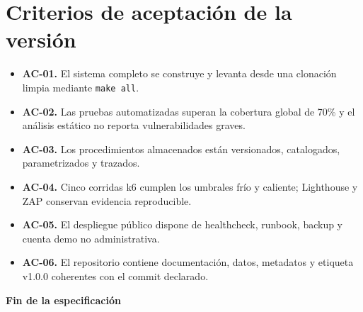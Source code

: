 \documentclass[11pt,a4paper]{article}
\begin{document}
\section{Criterios de aceptación de la versión}
\begin{itemize}[label=\textbf{--}]
    \item \textbf{AC-01.} El sistema completo se construye y levanta desde una clonación limpia mediante \texttt{make all}.
    \item \textbf{AC-02.} Las pruebas automatizadas superan la cobertura global de 70\% y el análisis estático no reporta vulnerabilidades graves.
    \item \textbf{AC-03.} Los procedimientos almacenados están versionados, catalogados, parametrizados y trazados.
    \item \textbf{AC-04.} Cinco corridas k6 cumplen los umbrales frío y caliente; Lighthouse y ZAP conservan evidencia reproducible.
    \item \textbf{AC-05.} El despliegue público dispone de healthcheck, runbook, backup y cuenta demo no administrativa.
    \item \textbf{AC-06.} El repositorio contiene documentación, datos, metadatos y etiqueta v1.0.0 coherentes con el commit declarado.
\end{itemize}

\vspace{1cm}
\noindent\textbf{\Large Fin de la especificación}
\end{document}
